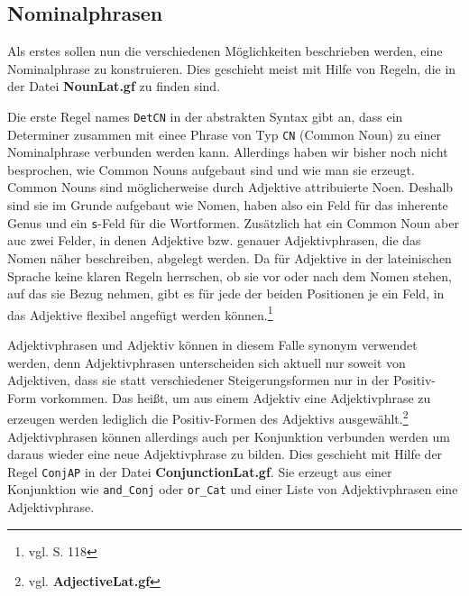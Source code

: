 \documentclass[12pt,abstract=on,titlepage,bibliography=totoc,ngerman,listof=totoc]{scrreprt}
\begin{document}
\subsection{Nominalphrasen}
\label{subsec:nominalphrasen}
Als erstes sollen nun die verschiedenen Möglichkeiten beschrieben werden, eine Nominalphrase zu konstruieren. Dies geschieht meist mit Hilfe von Regeln, die in der Datei \textbf{NounLat.gf} zu finden sind. \par
Die erste Regel names \texttt{DetCN} in der abstrakten Syntax gibt an, dass ein Determiner zusammen mit einee Phrase von Typ \texttt{CN} (Common Noun) zu einer Nominalphrase verbunden werden kann. Allerdings haben wir bisher noch nicht besprochen, wie Common Nouns aufgebaut sind und wie man sie erzeugt. Common Nouns sind möglicherweise durch Adjektive attribuierte Noen. Deshalb sind sie im Grunde aufgebaut wie Nomen, haben also ein Feld für das inherente Genus und ein \texttt{s}-Feld für die Wortformen. Zusätzlich hat ein Common Noun aber auc zwei Felder, in denen Adjektive bzw. genauer Adjektivphrasen, die das Nomen näher beschreiben, abgelegt werden. Da für Adjektive in der lateinischen Sprache keine klaren Regeln herrschen, ob sie vor oder nach dem Nomen stehen, auf das sie Bezug nehmen, gibt es für jede der beiden Positionen je ein Feld, in das Adjektive flexibel angefügt werden können.\footnote{vgl. \cite{BAYER-LINDAUER1994} S. 118} \par
Adjektivphrasen und Adjektiv können in diesem Falle synonym verwendet werden, denn Adjektivphrasen unterscheiden sich aktuell nur soweit von Adjektiven, dass sie statt verschiedener Steigerungsformen nur in der Positiv-Form vorkommen. Das heißt, um aus einem Adjektiv eine Adjektivphrase zu erzeugen werden lediglich die Positiv-Formen des Adjektivs ausgewählt.\footnote{vgl. \textbf{AdjectiveLat.gf}} Adjektivphrasen können allerdings auch per Konjunktion verbunden werden um daraus wieder eine neue Adjektivphrase zu bilden. Dies geschieht mit Hilfe der Regel \texttt{ConjAP} in der Datei \textbf{ConjunctionLat.gf}. Sie erzeugt aus einer Konjunktion wie \texttt{and\_Conj} oder \texttt{or\_Cat} und einer Liste von Adjektivphrasen eine Adjektivphrase. \par
\end{document}
